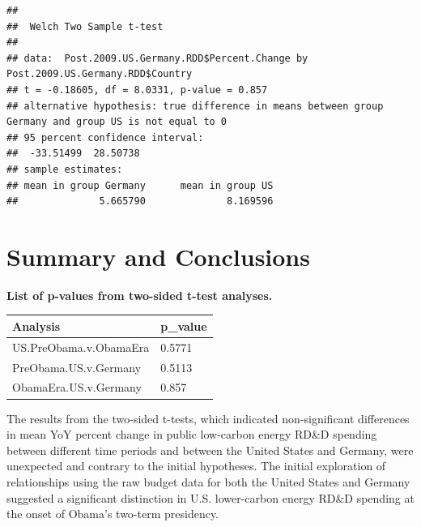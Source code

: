 \documentclass[
  12pt,
]{article}
\begin{document}
\begin{verbatim}
## 
##  Welch Two Sample t-test
## 
## data:  Post.2009.US.Germany.RDD$Percent.Change by Post.2009.US.Germany.RDD$Country
## t = -0.18605, df = 8.0331, p-value = 0.857
## alternative hypothesis: true difference in means between group Germany and group US is not equal to 0
## 95 percent confidence interval:
##  -33.51499  28.50738
## sample estimates:
## mean in group Germany      mean in group US 
##              5.665790              8.169596
\end{verbatim}

\newpage

\hypertarget{summary-and-conclusions}{%
\section{Summary and Conclusions}\label{summary-and-conclusions}}

\textbf{List of p-values from two-sided t-test analyses.}

\begin{longtable}[]{@{}ll@{}}
\toprule()
Analysis & p\_value \\
\midrule()
\endhead
US.PreObama.v.ObamaEra & 0.5771 \\
PreObama.US.v.Germany & 0.5113 \\
ObamaEra.US.v.Germany & 0.857 \\
\bottomrule()
\end{longtable}

The results from the two-sided t-tests, which indicated non-significant
differences in mean YoY percent change in public low-carbon energy RD\&D
spending between different time periods and between the United States
and Germany, were unexpected and contrary to the initial hypotheses. The
initial exploration of relationships using the raw budget data for both
the United States and Germany suggested a significant distinction in
U.S. lower-carbon energy RD\&D spending at the onset of Obama's two-term
presidency.
\end{document}
